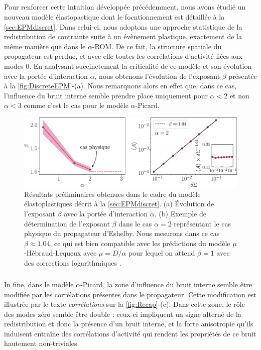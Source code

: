 \subparagraph{}Pour renforcer cette intuition développée précédemment, nous avons étudié un nouveau modèle élastopastique dont le focntionnement est détaillée à la \autoref{sec:EPMdiscret}. Dans celui-ci, nous adoptons une approche statistique de la redistribution de contrainte suite à un évènement plastique, exactement de la même manière que dans le $\alpha$-ROM. De ce fait, la structure spatiale du propagateur est perdue, et avec elle toutes les corrélations d'activité liées aux modes 0. En analysant succinctement la criticalité de ce modèle et son évolution avec la portée d’interaction $\alpha$, nous obtenons l'évolution de l'exposant $\beta$ présentée à la \autoref{fig:DiscreteEPM}-(a). Nous remarquons alors en effet que, dans ce cas, l'influence du bruit interne semble prendre place uniquement pour $\alpha < 2$ et non $\alpha < 3$ comme c'est le cas pour le modèle $\alpha$-Picard.

\begin{figure}[h]
	\centering
	\includegraphics[width=\textwidth]{Chapitre5/Figures/DiscreteEPM.pdf}
	\caption{Résultats préliminaires obtenues dans le cadre du modèle élastoplastiques décrit à la \autoref{sec:EPMdiscret}. (a) Évolution de l'exposant $\beta$ avec la portée d'interaction $\alpha$. (b) Exemple de détermination de l'exposant $\beta$ dans le cas $\alpha = 2$ représentant le cas physique du propagateur d'Eshelby. Nous mesurons dans ce cas $\beta \approx 1.04$, ce qui est bien compatible avec les prédictions du modèle $\mu$-Hébraud-Lequeux avec $\mu = D/\alpha$ pour lequel on attend $\beta = 1$ avec des corrections logarithmiques \cite{lin_microscopic_2018}.}
	\label{fig:DiscreteEPM}
\end{figure}

\subparagraph{}In fine, dans le modèle $\alpha$-Picard, la zone d'influence du bruit interne semble être modifiée par les corrélations présentes dans le propagateur. Cette modification est illustrée par le texte \textit{corrélations} sur la \autoref{fig:Recap}-(c). Dans cette zone, le rôle des modes zéro semble être double : ceux-ci impliquent un signe alterné de la redistribution et donc la présence d'un bruit interne, et la forte anisotropie qu'ils induisent entraîne des corrélations d'activité qui rendent les propriétés de ce bruit hautement non-triviales.

